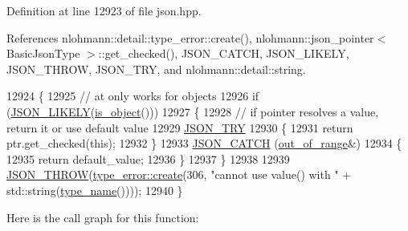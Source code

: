 Definition at line 12923 of file json.\+hpp.



References nlohmann\+::detail\+::type\+\_\+error\+::create(), nlohmann\+::json\+\_\+pointer$<$ Basic\+Json\+Type $>$\+::get\+\_\+checked(), J\+S\+O\+N\+\_\+\+C\+A\+T\+CH, J\+S\+O\+N\+\_\+\+L\+I\+K\+E\+LY, J\+S\+O\+N\+\_\+\+T\+H\+R\+OW, J\+S\+O\+N\+\_\+\+T\+RY, and nlohmann\+::detail\+::string.


\begin{DoxyCode}
12924     \{
12925         \textcolor{comment}{// at only works for objects}
12926         \textcolor{keywordflow}{if} (\hyperlink{json_8hpp_a41ecd1c4cf7c3d56477b9b685b5daa72}{JSON\_LIKELY}(\hyperlink{classnlohmann_1_1basic__json_af8f511af124e82e4579f444b4175787c}{is\_object}()))
12927         \{
12928             \textcolor{comment}{// if pointer resolves a value, return it or use default value}
12929             \hyperlink{json_8hpp_a985d3b82445302c57257f6432f261fe9}{JSON\_TRY}
12930             \{
12931                 \textcolor{keywordflow}{return} ptr.get\_checked(\textcolor{keyword}{this});
12932             \}
12933             \hyperlink{json_8hpp_a6954bec49ed2a2dfb938c1131c82740a}{JSON\_CATCH} (\hyperlink{classnlohmann_1_1basic__json_a28f7c2f087274a0012eb7a2333ee1580}{out\_of\_range}&)
12934             \{
12935                 \textcolor{keywordflow}{return} default\_value;
12936             \}
12937         \}
12938 
12939         \hyperlink{json_8hpp_a6c274f6db2e65c1b66c7d41b06ad690f}{JSON\_THROW}(\hyperlink{classnlohmann_1_1detail_1_1type__error_aecc083aea4b698c33d042670ba50c10f}{type\_error::create}(306, \textcolor{stringliteral}{"cannot use value() with "} + 
      std::string(\hyperlink{classnlohmann_1_1basic__json_a9d0a478571f82f0163b96b2424cd998f}{type\_name}())));
12940     \}
\end{DoxyCode}
Here is the call graph for this function\+:
\mbox{\label{classnlohmann_1_1basic__json_a869c900ee02cf1a68988dcce3b375424}} 
